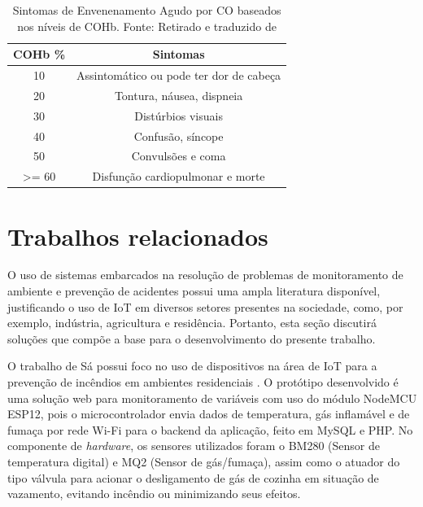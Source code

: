 \begin{table}[h!]
    \centering
    \caption{Sintomas de Envenenamento Agudo por CO baseados nos níveis de COHb. Fonte: Retirado e traduzido de \cite{carbon-monoxide-poisoning-varon}}
    \begin{tabular}{c|c}
        \hline
        \textbf{COHb \%} & \textbf{Sintomas} \\
        \hline
        10 & Assintomático ou pode ter dor de cabeça \\
        \hline
        20 & Tontura, náusea, dispneia \\
        \hline
        30 & Distúrbios visuais \\
        \hline
        40 & Confusão, síncope \\
        \hline
        50 & Convulsões e coma \\
        \hline
        >= 60 & Disfunção cardiopulmonar e morte \\
        \hline
    \end{tabular}
\end{table}



\section{Trabalhos relacionados}\label{cap2:tabRel}

O uso de sistemas embarcados na resolução de problemas de monitoramento de ambiente e prevenção 
de acidentes possui uma ampla literatura disponível, justificando o uso de IoT em diversos setores 
presentes na sociedade, como, por exemplo, indústria, agricultura e residência. Portanto, esta seção 
discutirá soluções que compõe a base para o desenvolvimento do presente trabalho.

O trabalho de Sá possui foco no uso de dispositivos na área de IoT para a prevenção de incêndios em ambientes residenciais \cite{uea-iot-deteccao-incendio}. 
O protótipo desenvolvido é uma solução web para monitoramento de variáveis com uso do módulo NodeMCU ESP12, pois o microcontrolador envia dados de temperatura, gás inflamável e de 
fumaça por rede Wi-Fi para o backend da aplicação, feito em MySQL e PHP. No componente de \textit{hardware}, os sensores utilizados foram o BM280 (Sensor de temperatura digital) e
MQ2 (Sensor de gás/fumaça), assim como o atuador do tipo válvula para acionar o desligamento de gás de cozinha em situação de vazamento, evitando incêndio ou minimizando seus efeitos.

